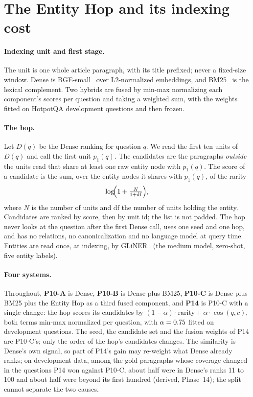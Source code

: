 \section{The Entity Hop and its indexing cost}
\label{sec:hop}

\paragraph{Indexing unit and first stage.} The unit is one whole article paragraph, with its title
prefixed; never a fixed-size window. Dense is BGE-small~\citep{xiao2024cpack} over
L2-normalized embeddings, and BM25~\citep{robertson2009bm25} is the lexical complement. Two
hybrids are fused by min-max normalizing each component's scores per question and taking a
weighted sum, with the weights fitted on HotpotQA development questions and then frozen.

\paragraph{The hop.} Let $D(q)$ be the Dense ranking for question $q$. We read the first
ten units of $D(q)$ and call the first unit $p_1(q)$. The candidates are the paragraphs
\emph{outside} the units read that share at least one raw entity node with $p_1(q)$. The score
of a candidate is the sum, over the entity nodes it shares with $p_1(q)$, of the rarity
\begin{equation}
  \log\!\Bigl(1+\tfrac{N}{1+\mathrm{df}}\Bigr),
\end{equation}
where $N$ is the number of units and $\mathrm{df}$ the number of units holding the entity.
Candidates are ranked by score, then by unit id; the list is not padded. The hop never looks at
the question after the first Dense call, uses one seed and one hop, and has no relations, no
canonicalization and no language model at query time. Entities are read once, at indexing,
by GLiNER~\citep{zaratiana2024gliner} (the medium model, zero-shot, five entity
labels).

\paragraph{Four systems.} Throughout, \textbf{P10-A} is Dense, \textbf{P10-B} is Dense plus BM25,
\textbf{P10-C} is Dense plus BM25 plus the Entity Hop as a third fused component, and
\textbf{P14} is P10-C with a single change: the hop scores its candidates by
$(1-\alpha)\cdot\text{rarity}+\alpha\cdot\cos(q,c)$, both terms min-max normalized per question,
with $\alpha=0.75$ fitted on development questions. The seed, the candidate set and
the fusion weights of P14 are P10-C's; only the order of the hop's candidates changes. The
similarity is Dense's own signal, so part of P14's gain may re-weight what Dense already ranks;
on development data, among the gold paragraphs whose coverage changed in the questions P14 won
against P10-C, about half were in Dense's ranks 11 to 100 and about half were beyond its first
hundred (derived, Phase~14); the split cannot separate the two causes.

